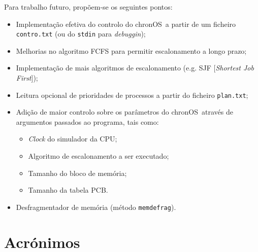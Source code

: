 \documentclass[a4paper,11pt,onecolumn,oneside]{article}
\newcommand{\chronOS}{\textsf{chronOS}}
\begin{document}
	\vspace{0.6cm}
	
	Para trabalho futuro, propõem-se os seguintes pontos:
	
	\begin{itemize}
		\item Implementação efetiva do controlo do \chronOS~a partir de um ficheiro \texttt{contro.txt} (ou do \texttt{stdin} para \textit{debuggin});
		\item Melhorias no algoritmo FCFS para permitir escalonamento a longo prazo;
		\item Implementação de mais algoritmos de escalonamento (e.g. SJF [\textit{Shortest Job First}]);
		\item Leitura opcional de prioridades de processos a partir do ficheiro \texttt{plan.txt};
		\item Adição de maior controlo sobre os parâmetros do \chronOS~através de argumentos passados ao programa, tais como:
		\begin{itemize}
			\item \textit{Clock} do simulador da CPU;
			\item Algoritmo de escalonamento a ser executado;
			\item Tamanho do bloco de memória;
			\item Tamanho da tabela PCB.
		\end{itemize}
	
		\item Desfragmentador de memória (método \verb|memdefrag|).
	\end{itemize}
	
	\section{Acrónimos}
    \label{sec:acron}
    
    \begin{acronym}[PCB]
    \end{acronym}
	
\end{document}
